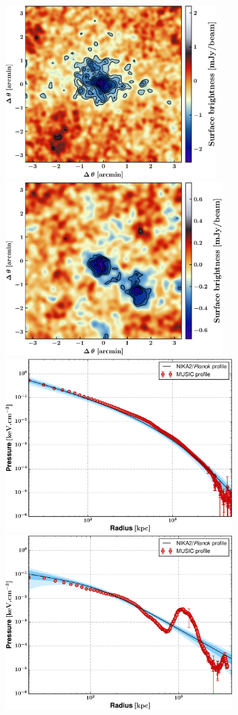\documentclass[twocolumn,traditabstract]{aa}
\begin{document}
\begin{figure}[h!]
\centering
\includegraphics[height=6.6cm]{NIKA2_relax_map.pdf}
\hspace{1.2cm}
\includegraphics[height=6.6cm]{NIKA2_disturb_map.pdf}
\includegraphics[height=6.6cm]{NIKA2_relax_profile.pdf}
\hspace{0.6cm}
\includegraphics[height=6.6cm]{NIKA2_dist_profile.pdf}

\end{figure}
\end{document}
